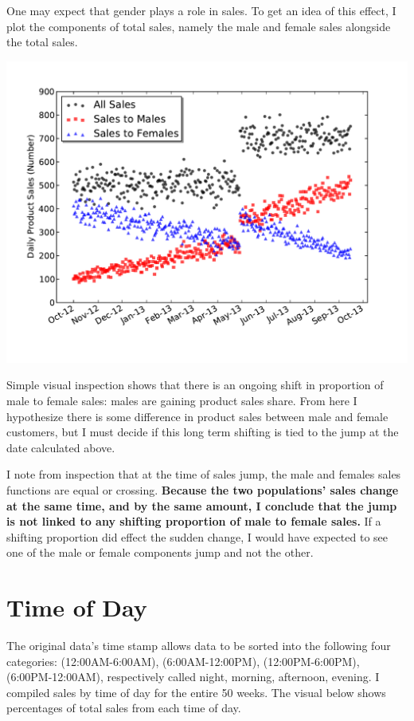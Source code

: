 \documentclass{article}[12pt]
\begin{document}
One may expect that gender plays a role in sales. To get an idea of this effect,
I plot the components of total sales, namely the male and female sales alongside
the total sales.


\includegraphics[scale=0.7]{../DailySalesComponentsFINAL.pdf}


Simple visual inspection shows that there is an ongoing shift in proportion of male to female sales: males are gaining product sales share. From here I hypothesize there is
some difference in product sales between male and female customers, but I must decide
if this long term shifting is tied to the jump at the date calculated above.

I note from inspection that at the time of sales jump, the male and females sales functions are equal or crossing.
{\bf Because the two populations' sales change at the same time, and by the same amount, I conclude that the jump is not linked to any shifting proportion of male to female sales.}
If a shifting proportion did effect the sudden change, I would have expected to see
one of the male or female components jump and not the other.

\section{Time of Day}

The original data's time stamp allows data to be sorted into the following four
categories: (12:00AM-6:00AM), (6:00AM-12:00PM), (12:00PM-6:00PM), (6:00PM-12:00AM),
 respectively called night, morning, afternoon, evening. I compiled sales by time of day
for the entire 50 weeks. The visual below shows percentages of total
sales from each time of day.
\end{document}
